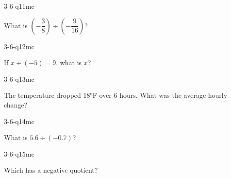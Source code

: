 \begin{practiceQuestion}{3-6-q11}{mc}
\begin{questionText}
What is $\left(-\dfrac{3}{8}\right) \div \left(-\dfrac{9}{16}\right)$?
\end{questionText}
\end{practiceQuestion}

\begin{practiceQuestion}{3-6-q12}{mc}
\begin{questionText}
If $x \div (-5) = 9$, what is $x$?
\end{questionText}
\end{practiceQuestion}

\begin{practiceQuestion}{3-6-q13}{mc}
\begin{questionText}
The temperature dropped $18°$F over $6$ hours. What was the average hourly change?
\end{questionText}
\end{practiceQuestion}

\begin{practiceQuestion}{3-6-q14}{mc}
\begin{questionText}
What is $5.6 \div (-0.7)$?
\end{questionText}
\end{practiceQuestion}

\begin{practiceQuestion}{3-6-q15}{mc}
\begin{questionText}
Which has a negative quotient?
\end{questionText}
\end{practiceQuestion}

